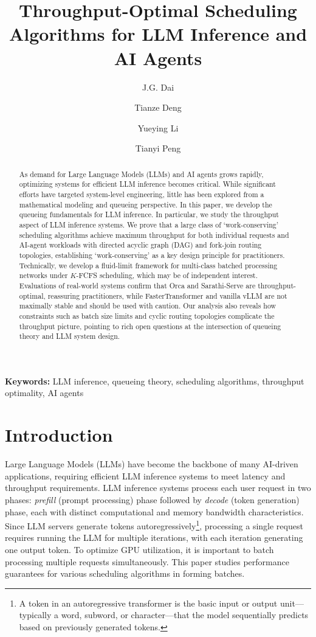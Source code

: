 \documentclass[11pt]{article}
\title{\textbf{Throughput-Optimal Scheduling Algorithms for LLM Inference and AI Agents}}
\author[1]{J.G. Dai}
\author[2]{Tianze Deng}
\author[1]{Yueying Li}
\author[3]{Tianyi Peng}
\affil[1]{School of Operations Research and Information Engineering, Cornell University\\
  \texttt{\{jd694,yl3469\}@cornell.edu}}
\affil[2]{Operations Management, Booth School of Business, University of Chicago\\
  \texttt{tianze1@uchicago.edu}}
\affil[3]{Decision, Risk and Operations, Columbia Business School, Columbia University\\
  \texttt{tianyi.peng@columbia.edu}}
\date{}
\theoremstyle{plain}
\theoremstyle{definition}
\theoremstyle{remark}
\begin{document}
\maketitle

\begin{abstract}
As demand for Large Language Models (LLMs) and AI agents grows rapidly, optimizing systems for efficient LLM inference becomes critical. While significant efforts have targeted system-level engineering, little has been explored from a mathematical modeling and queueing perspective.
In this paper, we develop the queueing fundamentals for LLM inference. In particular, we study the throughput aspect of LLM inference systems. We prove that a large class of `work-conserving' scheduling algorithms achieve maximum throughput for both individual requests and AI-agent workloads with directed acyclic graph (DAG) and fork-join routing topologies, establishing `work-conserving' as a key design principle for practitioners. Technically, we develop a fluid-limit framework for multi-class batched processing networks under $K$-FCFS scheduling, which may be of independent interest. Evaluations of real-world systems confirm that Orca and Sarathi-Serve are throughput-optimal, reassuring practitioners, while FasterTransformer and vanilla vLLM are not maximally stable and should be used with caution. Our analysis also reveals how constraints such as batch size limits and cyclic routing topologies complicate the throughput picture, pointing to rich open questions at the intersection of queueing theory and LLM system design.
\end{abstract}

\medskip
\noindent\textbf{Keywords:} LLM inference, queueing theory, scheduling algorithms, throughput optimality, AI agents

\bigskip

\section{Introduction}

Large Language Models (LLMs) have become the backbone of many AI-driven applications, requiring efficient LLM inference systems to meet latency and throughput requirements. LLM inference systems process each user request in two phases: \textit{prefill} (prompt processing) phase followed by \textit{decode} (token generation) phase, each with distinct computational and memory bandwidth characteristics. Since LLM servers generate tokens autoregressively\footnote{A token in an autoregressive transformer is the basic input or output unit—typically a word, subword, or character—that the model sequentially predicts based on previously generated tokens.}, processing a single request requires running the LLM for multiple iterations, with each iteration generating one output token.  To optimize GPU utilization, it is important to batch processing multiple requests simultaneously. This paper studies performance guarantees for  various scheduling algorithms in forming batches.  
\end{document}
